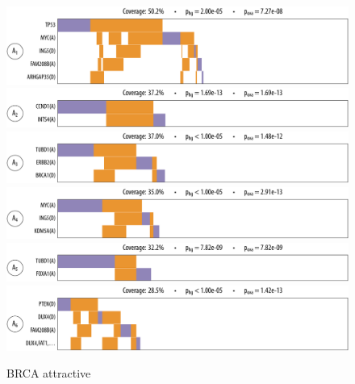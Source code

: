 \begin{figure}[htb]
\centering
\includegraphics[width=\textwidth]{figures/genes/brca_1_a.pdf}\\[2em]
\includegraphics[width=\textwidth]{figures/genes/brca_11_a.pdf}\\[2em]
\includegraphics[width=\textwidth]{figures/genes/brca_7_a.pdf}\\[2em]
\includegraphics[width=\textwidth]{figures/genes/brca_8_a.pdf}\\[2em]
\includegraphics[width=\textwidth]{figures/genes/brca_14_a.pdf}\\[2em]
\includegraphics[width=\textwidth]{figures/genes/brca_4_a.pdf}\\[2em]
\caption{BRCA attractive}
\end{figure}

